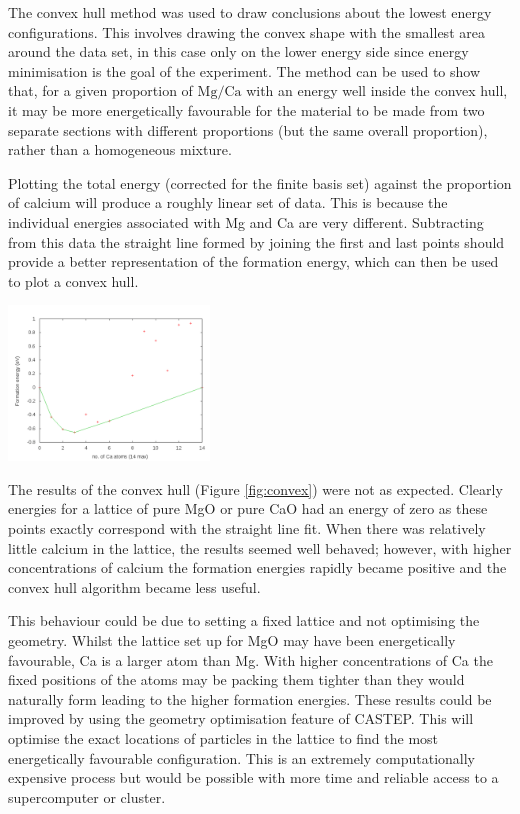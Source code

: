 \documentclass[a4paper,12pt]{article}
\begin{document}
\begin{multicols}{2}
	The convex hull method\cite{jarvis1973identification} was used to draw conclusions about the lowest energy configurations. This involves drawing the convex shape with the smallest area around the data set, in this case only on the lower energy side since energy minimisation is the goal of the experiment. The method can be used to show that, for a given proportion of $\mathrm{Mg}/\mathrm{Ca}$ with an energy well inside the convex hull, it may be more energetically favourable for the material to be made from two separate sections with different proportions (but the same overall proportion), rather than a homogeneous mixture.
	
	Plotting the total energy (corrected for the finite basis set) against the proportion of calcium will produce a roughly linear set of data. This is because the individual energies associated with Mg and Ca are very different. Subtracting from this data the straight line formed by joining the first and last points should provide a better representation of the formation energy, which can then be used to plot a convex hull.
    \begin{center}
	    \includegraphics[keepaspectratio=true,width=0.4\textwidth]{convex}
		\label{fig:convex} 
	\end{center}
    The results of the convex hull (Figure \ref{fig:convex}) were not as expected.  Clearly energies for a lattice of pure MgO or pure CaO had an energy of zero as these points exactly correspond with the straight line fit. When there was relatively little calcium in the lattice, the results seemed well behaved; however, with higher concentrations of calcium the formation energies rapidly became positive and the convex hull algorithm became less useful.   
    
    This behaviour could be due to setting a fixed lattice and not optimising the geometry. Whilst the lattice set up for MgO may have been energetically favourable, Ca is a larger atom than Mg. With higher concentrations of Ca the fixed positions of the atoms may be packing them tighter than they would naturally form leading to the higher formation energies. These results could be improved by using the geometry optimisation feature of CASTEP. This will optimise the exact locations of particles in the lattice to find the most energetically favourable configuration. This is  an extremely computationally expensive process but would be possible with more time and reliable access to a supercomputer or cluster.
    

\end{multicols}
\end{document}

